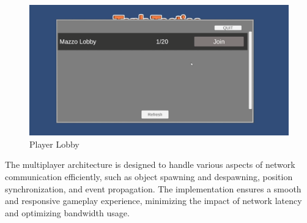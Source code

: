 \begin{figure}[h]
    \centering
    \begin{minipage}{0.49\textwidth}
    \centering
    \includegraphics[width=1\textwidth]{figures/Lobby.png}
    \caption{Player Lobby}
    \label{fig:player_lobby}
    \end{minipage}
\end{figure}

\noindent The multiplayer architecture is designed to handle various aspects of network communication efficiently, such as object spawning and despawning, position synchronization, and event propagation. The implementation ensures a smooth and responsive gameplay experience, minimizing the impact of network latency and optimizing bandwidth usage.

